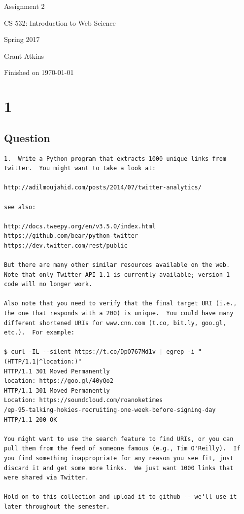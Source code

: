 \documentclass[letterpaper,11pt]{article}
\begin{document}
\begin{titlepage}

\begin{center}

\Huge{Assignment 2}

\Large{CS 532:  Introduction to Web Science}

\Large{Spring 2017}

\Large{Grant Atkins}

\Large Finished on \today

\end{center}

\end{titlepage}

\newpage


\section*{1}


\subsection*{Question}

\begin{verbatim}
1.  Write a Python program that extracts 1000 unique links from
Twitter.  You might want to take a look at:

http://adilmoujahid.com/posts/2014/07/twitter-analytics/

see also:

http://docs.tweepy.org/en/v3.5.0/index.html
https://github.com/bear/python-twitter
https://dev.twitter.com/rest/public

But there are many other similar resources available on the web.
Note that only Twitter API 1.1 is currently available; version 1
code will no longer work.

Also note that you need to verify that the final target URI (i.e.,
the one that responds with a 200) is unique.  You could have many
different shortened URIs for www.cnn.com (t.co, bit.ly, goo.gl,
etc.).  For example:

$ curl -IL --silent https://t.co/DpO767Md1v | egrep -i "(HTTP/1.1|^location:)"
HTTP/1.1 301 Moved Permanently
location: https://goo.gl/40yQo2
HTTP/1.1 301 Moved Permanently
Location: https://soundcloud.com/roanoketimes
/ep-95-talking-hokies-recruiting-one-week-before-signing-day
HTTP/1.1 200 OK

You might want to use the search feature to find URIs, or you can
pull them from the feed of someone famous (e.g., Tim O'Reilly).  If
you find something inappropriate for any reason you see fit, just
discard it and get some more links.  We just want 1000 links that
were shared via Twitter.

Hold on to this collection and upload it to github -- we'll use it
later throughout the semester.
\end{verbatim}
\end{document}
